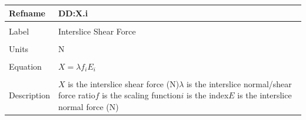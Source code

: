 \documentclass[12pt]{article}
\begin{document}
\noindent \begin{minipage}{\textwidth}
\begin{tabular}{p{} p{}}
\toprule \textbf{Refname} & \textbf{DD:X.i}
\label{DD:X.i}
\\ \midrule \\
Label & Interslice Shear Force
\\ \midrule \\
Units & N
\\ \midrule \\
Equation & $X=\lambda{} f_{i} E_{i}$
\\ \midrule \\
Description & $X$ is the interslice shear force (N)\newline$\lambda{}$ is the interslice normal/shear force ratio\newline$f$ is the scaling function\newline$i$ is the index\newline$E$ is the interslice normal force (N)
\\ \bottomrule \end{tabular}
\end{minipage}\\
~\newline
\end{document}
